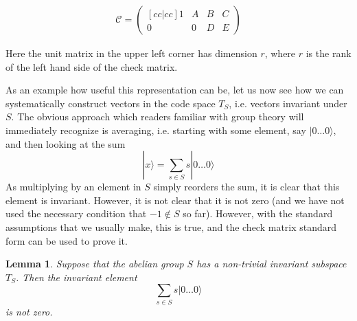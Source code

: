 \documentclass[a4paper, draft]{article}
\theoremstyle{own}
\newtheorem{lem}[thm]{Lemma}
\theoremstyle{remark}
\begin{document}
\begin{align}\label{eq:checkmatrixstandard}
\mathcal{C} = 
\begin{pmatrix}[cc|cc]
1 & A & B & C \\
0 & 0 & D & E
\end{pmatrix}
\end{align}

Here the unit matrix in the upper left corner has dimension $r$, where $r$ is the rank of the left hand side of the check matrix. 

As an example how useful this representation can be, let us now see how we can systematically construct vectors in the code space $T_S$, i.e. vectors invariant under $S$. The obvious approach which readers familiar with group theory will immediately recognize is averaging, i.e. starting with some element, say $|0 \dots 0 \rangle$, and then looking at the sum
$$
|x \rangle = \sum_{s \in S} s |0 \dots 0 \rangle
$$
As multiplying by an element in $S$ simply reorders the sum, it is clear that this element is invariant. However, it is not clear that it is not zero (and we have not used the necessary condition that $-1 \notin S$ so far). However, with the standard assumptions that we usually make, this is true, and the check matrix standard form can be used to prove it.

\begin{lem}
Suppose that the abelian group $S$ has a non-trivial invariant subspace $T_S$. Then the invariant element
$$
\sum_{s \in S} s |0 \dots 0 \rangle
$$
is not zero.
\end{lem}
\end{document}

